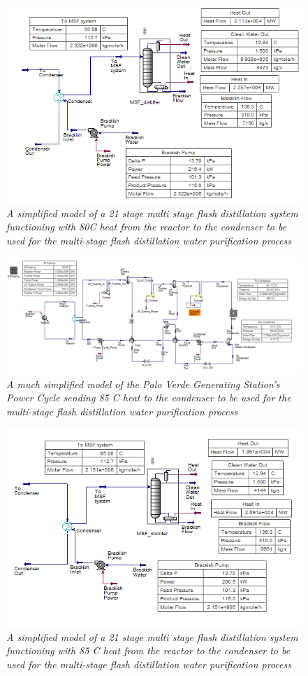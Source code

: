 \documentclass[12pt]{UIdahoMastersThesis}
\begin{document}
\begin{figure}
\includegraphics[width=\textwidth]{80MSF.PNG}
\caption{\small \sl A simplified model of a 21 stage multi stage flash distillation system functioning with 80\degree C heat from the reactor to the condenser to be used for the multi-stage flash distillation water purification process}
\end{figure}
\begin{figure}
\includegraphics[width=\textwidth]{85PC.PNG}
\caption{\small \sl A much simplified model of the Palo Verde Generating Station's Power Cycle sending 85 \degree C heat to the condenser to be used for the multi-stage flash distillation water purification process}
\end{figure}
\begin{figure}
\includegraphics[width=\textwidth]{85MSF.PNG}
\caption{\small \sl A simplified model of a 21 stage multi stage flash distillation system functioning with 85 \degree C heat from the reactor to the condenser to be used for the multi-stage flash distillation water purification process}
\end{figure}
\end{document}
